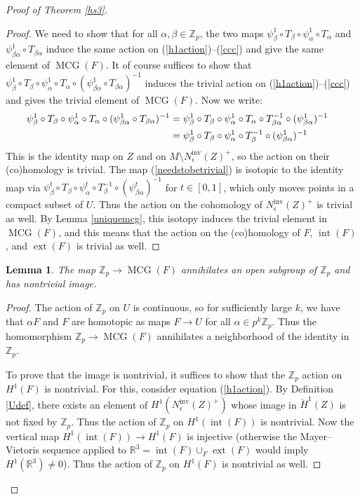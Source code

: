 \documentclass[12pt]{article}
\theoremstyle{plain}
\newtheorem{lemma}[theorem]{Lemma}
\theoremstyle{definition}
\theoremstyle{remark}
\numberwithin{equation}{section}
\begin{document}
\begin{proof}[Proof of Theorem \ref{hs3}]
\begin{proof}
We need to show that for all $\alpha,\beta\in\mathbb Z_p$, the two maps $\psi_\beta^1\circ T_\beta\circ\psi_\alpha^1\circ T_\alpha$ and $\psi_{\beta\alpha}^1\circ T_{\beta\alpha}$ induce the same action on (\ref{h1action})--(\ref{ccc}) and give the same element of $\operatorname{MCG}(F)$.  It of course suffices to show that $\psi_\beta^1\circ T_\beta\circ\psi_\alpha^1\circ T_\alpha\circ(\psi_{\beta\alpha}^1\circ T_{\beta\alpha})^{-1}$ induces the trivial action on (\ref{h1action})--(\ref{ccc}) and gives the trivial element of $\operatorname{MCG}(F)$.  Now we write:
\begin{align}\label{needstobetrivial}
\psi_\beta^1\circ T_\beta\circ\psi_\alpha^1\circ T_\alpha\circ(\psi_{\beta\alpha}^1\circ T_{\beta\alpha})^{-1}
&=\psi_\beta^1\circ T_\beta\circ\psi_\alpha^1\circ T_\alpha\circ T_{\beta\alpha}^{-1}\circ(\psi_{\beta\alpha}^1)^{-1}\cr
&=\psi_\beta^1\circ T_\beta\circ\psi_\alpha^1\circ T_\beta^{-1}\circ(\psi_{\beta\alpha}^1)^{-1}
\end{align}
This is the identity map on $Z$ and on $M\setminus N^{\operatorname{inv}}_\epsilon(Z)^+$, so the action on their (co)homology is trivial.  The map (\ref{needstobetrivial}) is isotopic to the identity map via $\psi_\beta^t\circ T_\beta\circ\psi_\alpha^t\circ T_\beta^{-1}\circ(\psi_{\beta\alpha}^t)^{-1}$ for $t\in[0,1]$, which only moves points in a compact subset of $U$.  Thus the action on the cohomology of $N^{\operatorname{inv}}_\epsilon(Z)^+$ is trivial as well.  By Lemma \ref{uniquemcg}, this isotopy induces the trivial element in $\operatorname{MCG}(F)$, and this means that the action on the (co)homology of $F$, $\operatorname{int}(F)$, and $\operatorname{ext}(F)$ is trivial as well.
\end{proof}

\begin{lemma}\label{mcgimage}
The map $\mathbb Z_p\to\operatorname{MCG}(F)$ annihilates an open subgroup of $\mathbb Z_p$ and has nontrivial image.
\end{lemma}

\begin{proof}
The action of $\mathbb Z_p$ on $U$ is continuous, so for sufficiently large $k$, we have that $\alpha F$ and $F$ are homotopic as maps $F\to U$ for all $\alpha\in p^k\mathbb Z_p$.  Thus the homomorphism $\mathbb Z_p\to\operatorname{MCG}(F)$ annihilates a neighborhood of the identity in $\mathbb Z_p$.

To prove that the image is nontrivial, it suffices to show that the $\mathbb Z_p$ action on $H^1(F)$ is nontrivial.  For this, consider equation (\ref{h1action}).  By Definition \ref{Udef}, there exists an element of $H^1(N^{\operatorname{inv}}_\epsilon(Z)^+)$ whose image in $\check H^1(Z)$ is not fixed by $\mathbb Z_p$.  Thus the action of $\mathbb Z_p$ on $H^1(\operatorname{int}(F))$ is nontrivial.  Now the vertical map $H^1(\operatorname{int}(F))\to H^1(F)$ is injective (otherwise the Mayer--Vietoris sequence applied to $\mathbb R^3=\operatorname{int}(F)\cup_F\operatorname{ext}(F)$ would imply $H^1(\mathbb R^3)\ne 0$).  Thus the action of $\mathbb Z_p$ on $H^1(F)$ is nontrivial as well.
\end{proof}


\end{proof}
\end{document}
